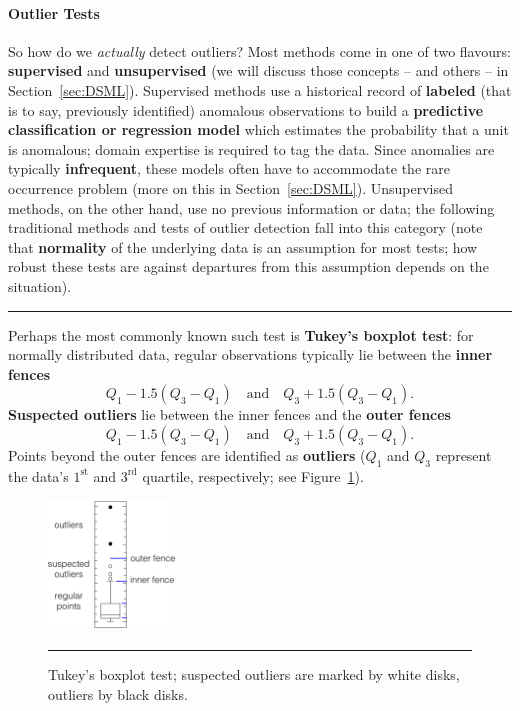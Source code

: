 \paragraph{Outlier Tests} So how do we \textit{actually} detect outliers? Most methods come in one of two flavours: \textbf{supervised} and \textbf{unsupervised} (we will discuss those concepts -- and others -- in Section~\ref{sec:DSML}).\newl 
Supervised methods use a historical record of \textbf{labeled} (that is to say, previously identified) anomalous observations to build a \textbf{predictive classification or regression model} which estimates the probability that a unit is anomalous; domain expertise is required to tag the data. Since anomalies are typically \textbf{infrequent}, these models often have to accommodate the rare occurrence problem (more on this in Section~\ref{sec:DSML}). Unsupervised methods, on the other hand, use no previous information or data; the following traditional methods and tests of outlier detection fall into this category (note that \textbf{normality} of the underlying data is an assumption for most tests; how robust these tests are against departures from this assumption depends on the situation).
\begin{center}
    \rule{0.5\textwidth}{.4pt}
\end{center}
Perhaps the most commonly known such test is \textbf{Tukey's boxplot test}: for normally distributed data, regular observations typically lie between the \textbf{inner fences} $$Q_1-1.5(Q_3-Q_1) \quad\mbox{and}\quad Q_3+1.5(Q_3-Q_1).$$ \textbf{Suspected outliers} lie between the inner fences and the \textbf{outer fences} 
$$Q_1-1.5(Q_3-Q_1) \quad\mbox{and}\quad Q_3+1.5(Q_3-Q_1).$$
Points beyond the outer fences are identified as \textbf{outliers} ($Q_1$ and $Q_3$ represent the data's   $1^{\textrm{st}}$ and $3^{\textrm{rd}}$ quartile, respectively; see Figure~\ref{fig:boxplot}).
\begin{figure}[t]
\centering
\includegraphics[width=0.30\textwidth]{images/DP/boxplot.png}
\caption[\small Tukey's boxplot test for outliers]{\small Tukey's boxplot test; suspected outliers are marked by white disks, outliers by black disks.}
\hrule\label{fig:boxplot}
\end{figure}

